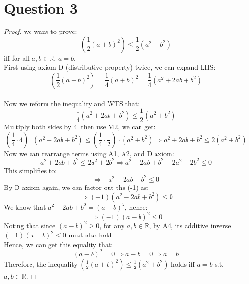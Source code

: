 \documentclass{article}
\begin{document}
\section*{Question 3}
\begin{proof}
    we want to prove:
    \[ \left( \frac{1}{2} (a + b)^2 \right) \leq \frac{1}{2} (a^2 + b^2) \]
    iff for all $a,b \in \mathbb{R}$, $a = b$.
    \\
    First using axiom D (distributive property) twice, we can expand LHS:
    \[ \left( \frac{1}{2} (a + b)^2 \right) = \frac{1}{4}(a + b)^2 = \frac{1}{4}(a^2 + 2ab + b^2) \]
    \\
    Now we reform the inequality and WTS that:
    \[ \frac{1}{4}(a^2 + 2ab + b^2) \leq \frac{1}{2} (a^2 + b^2) \]
    Multiply both sides by 4, then use M2, we can get:
    \[ (\frac{1}{4} \cdot 4) \cdot (a^2 + 2ab + b^2) \leq (\frac{1}{4} \cdot \frac{1}{2}) \cdot (a^2 + b^2) \Rightarrow a^2 + 2ab + b^2 \leq 2(a^2 + b^2) \]
    Now we can rearrange terms using A1, A2, and D axiom:
    \[ a^2 + 2ab + b^2 \leq 2a^2 + 2b^2 \Rightarrow a^2 + 2ab + b^2 - 2a^2 - 2b^2 \leq 0 \]
    This simplifies to:
    \[ \Rightarrow -a^2 + 2ab - b^2 \leq 0 \]
    By D axiom again, we can factor out the (-1) as:
    \[ \Rightarrow (-1)(a^2 - 2ab + b^2) \leq 0 \]
    We know that \( a^2 - 2ab + b^2 = (a - b)^2 \), hence:
    \[ \Rightarrow (-1)(a - b)^2 \leq 0 \]
    Noting that since $(a - b)^2 \geq 0$, for any $a,b \in \mathbb{R}$, by A4, its additive inverse $(-1)(a - b)^2 \leq 0$ must also hold.
    \\
    Hence, we can get this equality that:
    \[ (a - b)^2 = 0 \Rightarrow a - b = 0 \Rightarrow  a = b \]
    Therefore, the inequality $\left( \frac{1}{2} (a + b)^2 \right) \leq \frac{1}{2} (a^2 + b^2)$ holds iff $a = b$ s.t. $a,b \in \mathbb{R}$.
\end{proof}
\end{document}
